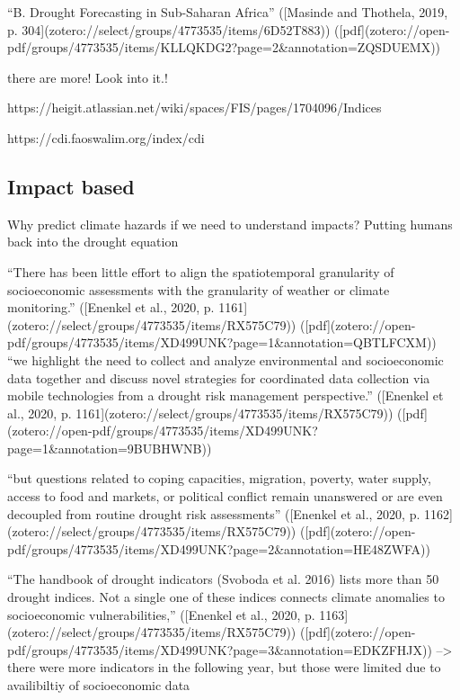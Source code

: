 {“B. Drought Forecasting in Sub-Saharan Africa” ([Masinde and Thothela, 2019, p. 304](zotero://select/groups/4773535/items/6D52T883)) ([pdf](zotero://open-pdf/groups/4773535/items/KLLQKDG2?page=2&annotation=ZQSDUEMX))

there are more! Look into it.!

https://heigit.atlassian.net/wiki/spaces/FIS/pages/1704096/Indices

https://cdi.faoswalim.org/index/cdi

\subsection{Impact based}
Why predict climate hazards if we need to understand impacts? Putting humans back into the drought equation

“There has been little effort to align the spatiotemporal granularity of socioeconomic assessments with the granularity of weather or climate monitoring.” ([Enenkel et al., 2020, p. 1161](zotero://select/groups/4773535/items/RX575C79)) ([pdf](zotero://open-pdf/groups/4773535/items/XD499UNK?page=1&annotation=QBTLFCXM))
“we highlight the need to collect and analyze environmental and socioeconomic data together and discuss novel strategies for coordinated data collection via mobile technologies from a drought risk management perspective.” ([Enenkel et al., 2020, p. 1161](zotero://select/groups/4773535/items/RX575C79)) ([pdf](zotero://open-pdf/groups/4773535/items/XD499UNK?page=1&annotation=9BUBHWNB))

“but questions related to coping capacities, migration, poverty, water supply, access to food and markets, or political conflict remain unanswered or are even decoupled from routine drought risk assessments” ([Enenkel et al., 2020, p. 1162](zotero://select/groups/4773535/items/RX575C79)) ([pdf](zotero://open-pdf/groups/4773535/items/XD499UNK?page=2&annotation=HE48ZWFA))

“The handbook of drought indicators (Svoboda et al. 2016) lists more than 50 drought indices. Not a single one of these indices connects climate anomalies to socioeconomic vulnerabilities,” ([Enenkel et al., 2020, p. 1163](zotero://select/groups/4773535/items/RX575C79)) ([pdf](zotero://open-pdf/groups/4773535/items/XD499UNK?page=3&annotation=EDKZFHJX))
--> there were more indicators in the following year, but those were limited due to availibiltiy of socioeconomic data

}

